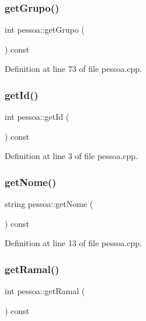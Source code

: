 \subsubsection{\texorpdfstring{get\+Grupo()}{getGrupo()}}
{\footnotesize\ttfamily int pessoa\+::get\+Grupo (\begin{DoxyParamCaption}{ }\end{DoxyParamCaption}) const}



Definition at line 73 of file pessoa.\+cpp.

\hypertarget{classpessoa_a9a20cb67d382a667ad8ed10761b50211}{}\label{classpessoa_a9a20cb67d382a667ad8ed10761b50211} 
\subsubsection{\texorpdfstring{get\+Id()}{getId()}}
{\footnotesize\ttfamily int pessoa\+::get\+Id (\begin{DoxyParamCaption}{ }\end{DoxyParamCaption}) const}



Definition at line 3 of file pessoa.\+cpp.

\hypertarget{classpessoa_ad673a812f80d63efaef99aa84096ceb1}{}\label{classpessoa_ad673a812f80d63efaef99aa84096ceb1} 
\subsubsection{\texorpdfstring{get\+Nome()}{getNome()}}
{\footnotesize\ttfamily string pessoa\+::get\+Nome (\begin{DoxyParamCaption}{ }\end{DoxyParamCaption}) const}



Definition at line 13 of file pessoa.\+cpp.

\hypertarget{classpessoa_afe3f63c712664c2ac32f89ed8595d75d}{}\label{classpessoa_afe3f63c712664c2ac32f89ed8595d75d} 
\subsubsection{\texorpdfstring{get\+Ramal()}{getRamal()}}
{\footnotesize\ttfamily int pessoa\+::get\+Ramal (\begin{DoxyParamCaption}{ }\end{DoxyParamCaption}) const}



